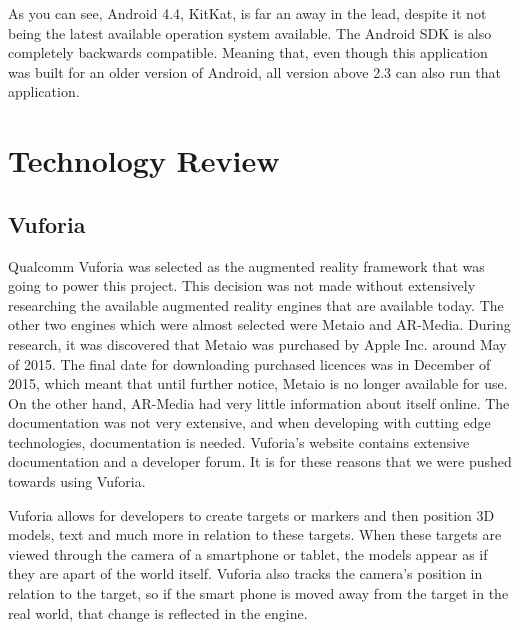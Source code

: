 As you can see, Android 4.4, KitKat, is far an away in the lead, despite it not being the latest available operation system available. The Android SDK is also completely backwards compatible. Meaning that, even though this application was built for an older version of Android, all version above 2.3 can also run that application.

\chapter{Technology Review}
\section{Vuforia}
Qualcomm Vuforia was selected as the augmented reality framework that was going to power this project. This decision was not made without extensively researching the available augmented reality engines that are available today. The other two engines which were almost selected were Metaio and AR-Media. During research, it was discovered that Metaio was purchased by Apple Inc. around May of 2015. The final date for downloading purchased licences was in December of 2015, which meant that until further notice, Metaio is no longer available for use. On the other hand, AR-Media had very little information about itself online. The documentation was not very extensive, and when developing with cutting edge technologies, documentation is needed. Vuforia’s website contains extensive documentation and a developer forum. It is for these reasons that we were pushed towards using Vuforia.

Vuforia allows for developers to create targets or markers and then position 3D models, text and much more in relation to these targets. When these targets are viewed through the camera of a smartphone or tablet, the models appear as if they are apart of the world itself. Vuforia also tracks the camera’s position in relation to the target, so if the smart phone is moved away from the target in the real world, that change is reflected in the engine.

